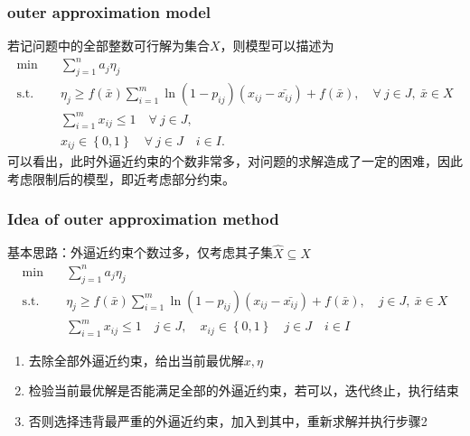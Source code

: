 \documentclass[CJK,10pt]{beamer}
\begin{document}
\begin{frame}
    \frametitle{outer approximation model}
    
    {\scriptsize
    若记问题中的全部整数可行解为集合$X$，则模型可以描述为
    \begin{align*} \tag{OA}
        \min\quad & \sum_{j=1}^n a_j \eta_j \\ 
        \mathrm{s. t.}\quad & \eta_j \geq f(\bar{x})\sum_{i = 1}^m \ln(1-p_{ij})(x_{ij} - \bar{x_{ij}}) + f(\bar{x}), \quad \forall ~ j \in J,\ \bar{x} \in X \\ 
        &\sum_{i=1}^m x_{ij} \leq 1\quad \forall ~ j \in J,\\
        & x_{ij} \in \left\{ 0,1 \right\} \quad \forall ~ j\in J\quad i \in I.
    \end{align*}
    可以看出，此时外逼近约束的个数非常多，对问题的求解造成了一定的困难，因此考虑限制后的模型，即近考虑部分约束。
    }
   
\end{frame}

\begin{frame}
    \frametitle{Idea of outer approximation method}
    {
    \scriptsize
    基本思路：外逼近约束个数过多，仅考虑其子集$\hat{X} \subseteq X$
    \begin{align*}
        \min\quad & \sum_{j=1}^n a_j \eta_j \\ 
        \mathrm{s. t.}\quad & \eta_j \geq f(\bar{x})\sum_{i = 1}^m \ln(1-p_{ij})(x_{ij} - \bar{x_{ij}}) + f(\bar{x}), \quad j \in J,\ \bar{x} \in X \\ 
        &\sum_{i=1}^m x_{ij} \leq 1\quad j \in J,\quad x_{ij} \in \left\{ 0,1 \right\} \quad j\in J\quad i \in I
    \end{align*}
    \begin{enumerate}
        \item 去除全部外逼近约束，给出当前最优解$x, \eta$
        \item 检验当前最优解是否能满足全部的外逼近约束，若可以，迭代终止，执行结束
        \item 否则选择违背最严重的外逼近约束，加入到其中，重新求解并执行步骤2
    \end{enumerate}
    }
\end{frame}
\end{document}
